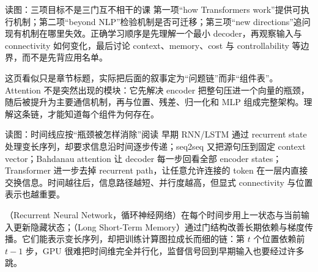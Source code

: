
\begin{knowledgebox}{读图：三项目标不是三门互不相干的课}
第一项“how Transformers work”提供可执行机制；第二项“beyond NLP”检验机制是否可迁移；第三项“new directions”追问现有机制在哪里失效。正确学习顺序是先理解一个最小 decoder，再观察输入与 connectivity 如何变化，最后讨论 context、memory、cost 与 controllability 等边界，而不是先背应用名单。
\end{knowledgebox}


这页看似只是章节标题，实际把后面的叙事定为“问题链”而非“组件表”。Attention 不是突然出现的模块：它先解决 encoder 把整句压进一个向量的瓶颈，随后被提升为主要通信机制，再与位置、残差、归一化和 MLP 组成完整架构。理解这条链，才能知道每个组件为何存在。


\begin{knowledgebox}{读图：时间线应按“瓶颈被怎样消除”阅读}
早期 RNN/LSTM 通过 recurrent state 处理变长序列，却要求信息沿时间逐步传递；seq2seq 又把源句压到固定 context vector；Bahdanau attention 让 decoder 每一步回看全部 encoder states；Transformer 进一步去掉 recurrent path，让任意允许连接的 token 在一层内直接交换信息。时间越往后，信息路径越短、并行度越高，但显式 connectivity 与位置表示也越重要。
\end{knowledgebox}


（Recurrent Neural Network，循环神经网络）在每个时间步用上一状态与当前输入更新隐藏状态；（Long Short-Term Memory）通过门结构改善长期依赖与梯度传播。它们能表示变长序列，却把训练计算图拉成长而细的链：第 $t$ 个位置依赖前 $t-1$ 步，GPU 很难把时间维完全并行化，监督信号回到早期输入也要经过许多跳。


